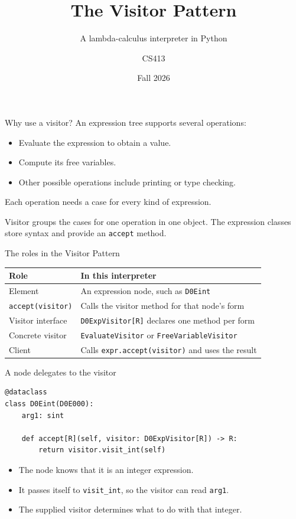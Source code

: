 \documentclass[aspectratio=169,11pt]{beamer}
\title{The Visitor Pattern}
\subtitle{A lambda-calculus interpreter in Python}
\author{CS413}
\date{Fall 2026}
\newcommand{\code}[1]{\texttt{#1}}
\begin{document}
\begin{frame}\titlepage\end{frame}

\begin{frame}{Why use a visitor?}
An expression tree supports several operations:
\begin{itemize}
\item Evaluate the expression to obtain a value.
\item Compute its free variables.
\item Other possible operations include printing or type checking.
\end{itemize}
\medskip
Each operation needs a case for every kind of expression.
\medskip

\alert{Visitor groups the cases for one operation in one object.}
The expression classes store syntax and provide an \code{accept} method.
\end{frame}

\begin{frame}{The roles in the Visitor Pattern}
\renewcommand{\arraystretch}{1.5}
\begin{tabular}{p{}p{}}
\toprule
Role & In this interpreter \\
\midrule
Element & An expression node, such as \code{D0Eint} \\
\code{accept(visitor)} & Calls the visitor method for that node's form \\
Visitor interface & \code{D0ExpVisitor[R]} declares one method per form \\
Concrete visitor & \code{EvaluateVisitor} or \code{FreeVariableVisitor} \\
Client & Calls \code{expr.accept(visitor)} and uses the result \\
\bottomrule
\end{tabular}
\end{frame}

\begin{frame}[fragile]{A node delegates to the visitor}
\begin{lstlisting}
@dataclass
class D0Eint(D0E000):
    arg1: sint

    def accept[R](self, visitor: D0ExpVisitor[R]) -> R:
        return visitor.visit_int(self)
\end{lstlisting}
\begin{itemize}
\item The node knows that it is an integer expression.
\item It passes itself to \code{visit\_int}, so the visitor can read \code{arg1}.
\item The supplied visitor determines what to do with that integer.
\end{itemize}
\end{frame}
\end{document}
